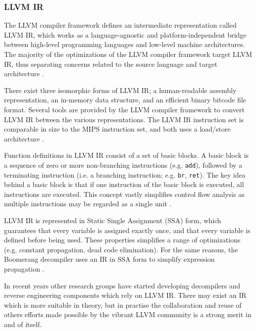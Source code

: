 
\subsubsection{LLVM IR}

The LLVM compiler framework defines an intermediate representation called LLVM IR, which works as a language-agnostic and platform-independent bridge between high-level programming languages and low-level machine architectures. The majority of the optimizations of the LLVM compiler framework target LLVM IR, thus separating concerns related to the source language and target architecture \cite{llvm_architecture}.

There exist three isomorphic forms of LLVM IR; a human-readable assembly representation, an in-memory data structure, and an efficient binary bitcode file format. Several tools are provided by the LLVM compiler framework to convert LLVM IR between the various representations. The LLVM IR instruction set is comparable in size to the MIPS instruction set, and both uses a load/store architecture \cite{mips_ref,llvm_lang_ref}.

Function definitions in LLVM IR consist of a set of basic blocks. A basic block is a sequence of zero or more non-branching instructions (e.g. \texttt{add}), followed by a terminating instruction (i.e. a branching instruction; e.g. \texttt{br}, \texttt{ret}). The key idea behind a basic block is that if one instruction of the basic block is executed, all instructions are executed. This concept vastly simplifies control flow analysis as multiple instructions may be regarded as a single unit \cite{decomp_of_llvm}.

LLVM IR is represented in Static Single Assignment (SSA) form, which guarantees that every variable is assigned exactly once, and that every variable is defined before being used. These properties simplifies a range of optimizations (e.g. constant propagation, dead code elimination). For the same reasons, the Boomerang decompiler uses an IR in SSA form to simplify expression propagation \cite{ssa_for_decomp}.

In recent years other research groups have started developing decompilers \cite{decomp_of_llvm,retargetable_decomp} and reverse engineering components \cite{mcsema} which rely on LLVM IR. There may exist an IR which is more suitable in theory, but in practise the collaboration and reuse of others efforts made possible by the vibrant LLVM community is a strong merit in and of itself.

